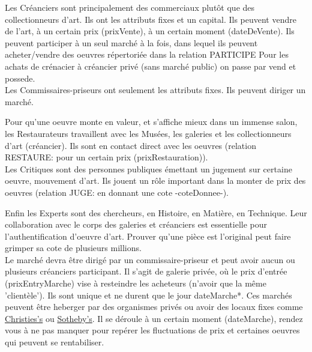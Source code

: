 \documentclass{article}
\begin{document}
    
\begin{multicols}{2}[]
Les Créanciers sont principalement des commerciaux plutôt que des collectionneurs d'art. 
Ils ont les attributs fixes et un capital.
Ils peuvent vendre de l'art, à un certain prix (prixVente), à un certain moment (dateDeVente).
Ils peuvent participer à un seul marché à la fois, dans lequel ils peuvent acheter/vendre des oeuvres répertoriée dans la relation PARTICIPE
Pour les achats de crénacier à créancier privé (sans marché public) on passe par vend et possede.
\\

    Les Commissaires-priseurs ont seulement les attributs fixes.
Ils peuvent diriger un marché. 

    Pour qu'une oeuvre monte en valeur, et s'affiche mieux dans un immense salon, les Restaurateurs travaillent avec les Musées, les galeries et les collectionneurs d'art (créancier).
Ils sont en contact direct avec les oeuvres (relation RESTAURE: pour un certain prix (prixRestauration)).
\\

    Les Critiques sont des personnes publiques émettant un jugement sur certaine oeuvre, mouvement d'art.
Ils jouent un rôle important dans la monter de prix des oeuvres (relation JUGE: en donnant une cote -coteDonnee-).
\end{multicols}

\clearpage

Enfin les Experts sont des chercheurs, en Histoire, en Matière, en Technique.
Leur collaboration avec le corps des galeries et créanciers est essentielle pour l'authentification d'oeuvre d'art.
Prouver qu'une pièce est l'original peut faire grimper sa cote de plusieurs millions. \cite{Christ's_Portrait}
\\

Le marché devra être dirigé par un commissaire-priseur et peut avoir aucun ou plusieurs créanciers participant.
Il s'agit de galerie privée, où le prix d'entrée (prixEntryMarche) vise à resteindre les acheteurs (n'avoir que la même 'clientèle').
Ils sont unique et ne durent que le jour dateMarche*.
Ces marchés peuvent être heberger par des organismes privés ou avoir des locaux fixes comme \href{https://fr.wikipedia.org/wiki/Christie's}{Christies's} ou \href{https://fr.wikipedia.org/wiki/Sotheby's}{Sotheby's}.
Il se déroule à un certain moment (dateMarche), rendez vous à ne pas manquer pour repérer les fluctuations de prix et certaines oeuvres qui peuvent se rentabiliser.
\\
\end{document}
